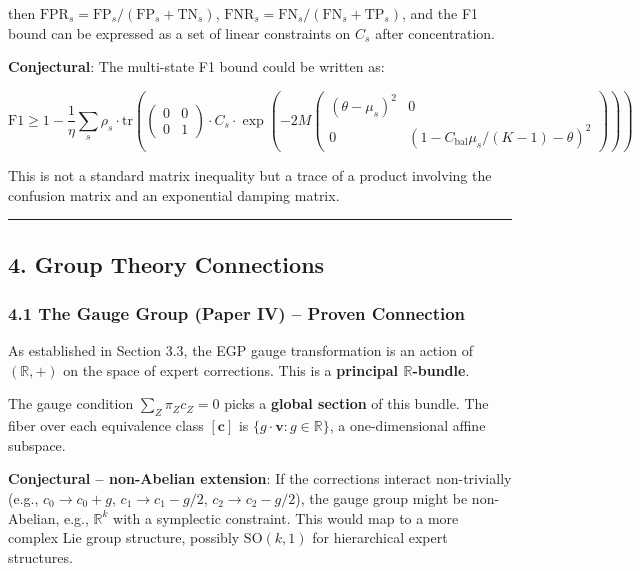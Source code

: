 \documentclass[
  12pt,
]{article}
\begin{document}
then \(\text{FPR}_s = \text{FP}_s/(\text{FP}_s + \text{TN}_s)\),
\(\text{FNR}_s = \text{FN}_s/(\text{FN}_s + \text{TP}_s)\), and the F1
bound can be expressed as a set of linear constraints on \(C_s\) after
concentration.

\textbf{Conjectural}: The multi-state F1 bound could be written as:

\[\text{F1} \geq 1 - \frac{1}{\eta} \sum_s \rho_s \cdot \text{tr}\left( \begin{pmatrix} 0 & 0 \\ 0 & 1 \end{pmatrix} \cdot C_s \cdot \exp\left(-2M \begin{pmatrix} (\theta - \mu_s)^2 & 0 \\ 0 & (1 - C_{\text{bal}}\mu_s/(K-1) - \theta)^2 \end{pmatrix}\right) \right)\]

This is not a standard matrix inequality but a trace of a product
involving the confusion matrix and an exponential damping matrix.

\begin{center}\rule{0.5\linewidth}{0.5pt}\end{center}

\subsection{4. Group Theory Connections}\label{group-theory-connections}

\subsubsection{4.1 The Gauge Group (Paper IV) -- Proven
Connection}\label{the-gauge-group-paper-iv-proven-connection}

As established in Section 3.3, the EGP gauge transformation is an action
of \((\mathbb{R}, +)\) on the space of expert corrections. This is a
\textbf{principal \(\mathbb{R}\)-bundle}.

The gauge condition \(\sum_Z \pi_Z c_Z = 0\) picks a \textbf{global
section} of this bundle. The fiber over each equivalence class
\([\mathbf{c}]\) is \(\{g \cdot \mathbf{v} : g \in \mathbb{R}\}\), a
one-dimensional affine subspace.

\textbf{Conjectural -- non-Abelian extension}: If the corrections
interact non-trivially (e.g., \(c_0 \to c_0 + g\),
\(c_1 \to c_1 - g/2\), \(c_2 \to c_2 - g/2\)), the gauge group might be
non-Abelian, e.g., \(\mathbb{R}^k\) with a symplectic constraint. This
would map to a more complex Lie group structure, possibly
\(\text{SO}(k, 1)\) for hierarchical expert structures.
\end{document}
